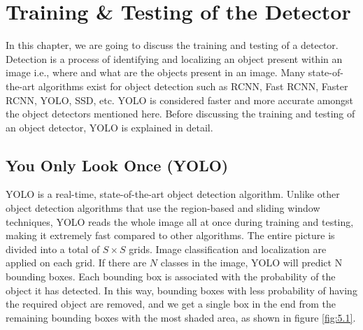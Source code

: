 \chapter{Training \& Testing of the
Detector}
\label{Chapter 5}
In this chapter, we are going to discuss the training and testing of a detector. Detection is a process of identifying and localizing an object present within an image i.e., where and what are the objects present in an image. Many state-of-the-art algorithms exist for object detection such as RCNN, Fast RCNN, Faster RCNN, YOLO, SSD, etc. YOLO is considered faster and more accurate amongst the object detectors mentioned here. Before discussing the training and testing of an object detector, YOLO  is explained in detail.
\section{You Only Look Once (YOLO)}
YOLO is a real-time, state-of-the-art object detection algorithm. Unlike other object detection algorithms that use the region-based and sliding window techniques, YOLO reads the whole image all at once during training and testing, making it extremely fast compared to other algorithms. The entire picture is divided into a total of $S \times S$ grids. Image classification and localization are applied on each grid. If there are $ N $ classes in the image, YOLO will predict N bounding boxes. Each bounding box is associated with the probability of the object it has detected. In this way, bounding boxes with less probability of having the required object are removed, and we get a single box in the end from the remaining bounding boxes with the most shaded area, as shown in figure \ref{fig:5.1}.

